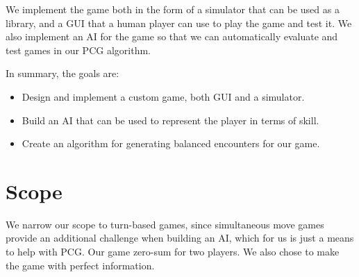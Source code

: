 We implement the game both in the form of a simulator that can be used as a
library, and a GUI that a human player can use to play the game and test it. We
also implement an AI for the game so that we can automatically evaluate and
test games in our PCG algorithm.

In summary, the goals are:

\begin{itemize}
\item Design and implement a custom game, both GUI and a simulator.
\item Build an AI that can be used to represent the player in terms of skill.
\item Create an algorithm for generating balanced encounters for our game.
\end{itemize}

\section{Scope}

We narrow our scope to turn-based games, since simultaneous move games provide
an additional challenge when building an AI, which for us is just a means to
help with PCG\@. Our game zero-sum for two players. We also chose to make the
game with perfect information. 
